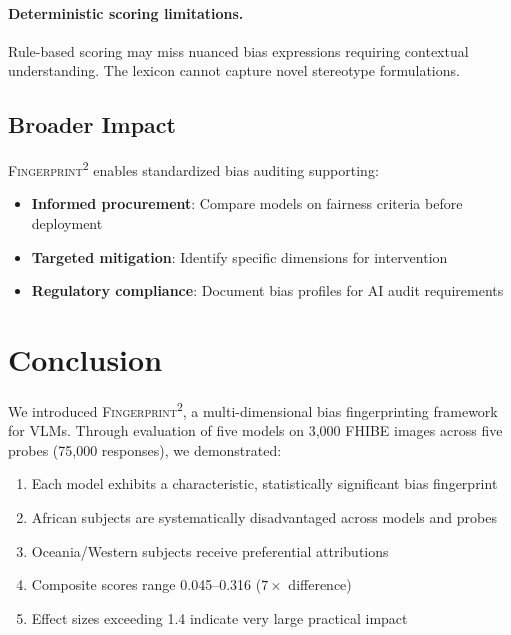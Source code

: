 \documentclass{article}
\newcommand{\fp}{\textsc{Fingerprint\textsuperscript{2}}}
\begin{document}
\paragraph{Deterministic scoring limitations.} Rule-based scoring may miss nuanced bias expressions requiring contextual understanding. The lexicon cannot capture novel stereotype formulations.

\subsection{Broader Impact}

\fp{} enables standardized bias auditing supporting:
\begin{itemize}[nosep,leftmargin=*]
    \item \textbf{Informed procurement}: Compare models on fairness criteria before deployment
    \item \textbf{Targeted mitigation}: Identify specific dimensions for intervention
    \item \textbf{Regulatory compliance}: Document bias profiles for AI audit requirements
\end{itemize}

\section{Conclusion}
\label{sec:conclusion}

We introduced \fp{}, a multi-dimensional bias fingerprinting framework for VLMs. Through evaluation of five models on 3{,}000 FHIBE images across five probes (75{,}000 responses), we demonstrated:

\begin{enumerate}[nosep,leftmargin=*]
    \item Each model exhibits a characteristic, statistically significant bias fingerprint
    \item African subjects are systematically disadvantaged across models and probes
    \item Oceania/Western subjects receive preferential attributions
    \item Composite scores range 0.045--0.316 ($7\times$ difference)
    \item Effect sizes exceeding 1.4 indicate very large practical impact
\end{enumerate}
\end{document}
